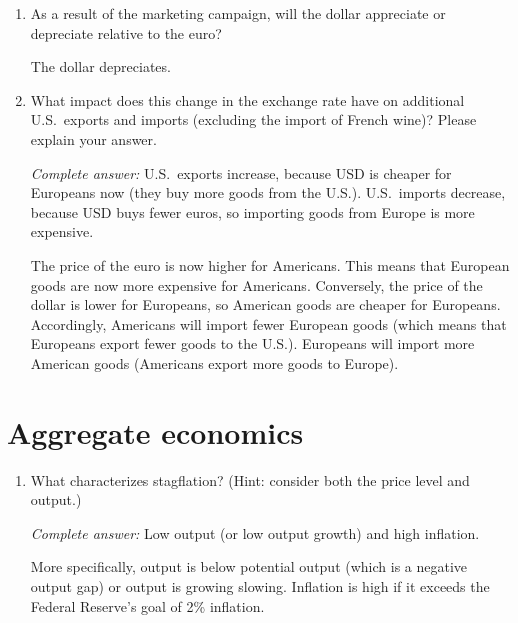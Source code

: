 \documentclass{assignment}
\begin{document}
\begin{enumerate}[resume]
\item As a result of the marketing campaign, will the dollar appreciate or depreciate relative to the euro?

\begin{solution}
The dollar depreciates.
\end{solution}

\item What impact does this change in the exchange rate have on additional U.S.~exports and imports (excluding the import of French wine)? Please explain your answer.

\begin{solution}
\emph{Complete answer:} U.S.~exports increase, because USD is cheaper for Europeans now (they buy more goods from the U.S.). U.S.~imports decrease, because USD buys fewer euros, so importing goods from Europe is more expensive.

The price of the euro is now higher for Americans. This means that European goods are now more expensive for Americans. Conversely, the price of the dollar is lower for Europeans, so American goods are cheaper for Europeans. Accordingly, Americans will import fewer European goods (which means that Europeans export fewer goods to the U.S.). Europeans will import more American goods (Americans export more goods to Europe).
\end{solution}

\end{enumerate}

\section{Aggregate economics}

\begin{enumerate}

\item What characterizes stagflation? (Hint: consider both the price level and output.)

\begin{solution}
\emph{Complete answer:} Low output (or low output growth) and high inflation.

More specifically, output is below potential output (which is a negative output gap) or output is growing slowing. Inflation is high if it exceeds the Federal Reserve's goal of 2\% inflation.
\end{solution}

\end{enumerate}
\end{document}
